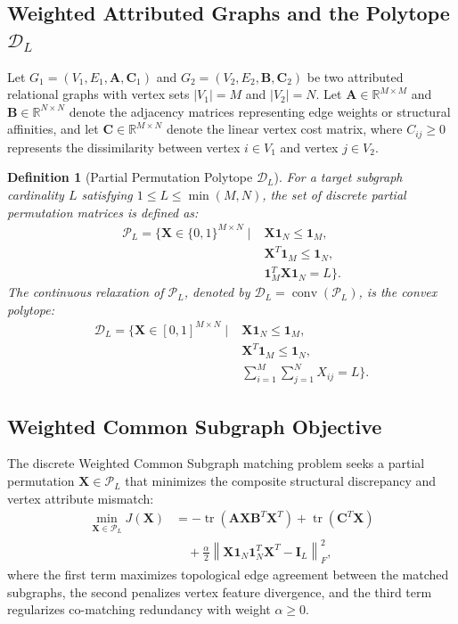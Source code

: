 \documentclass[a4paper,fleqn]{cas-dc}
\theoremstyle{thmstyleone}
\theoremstyle{thmstyletwo}
\theoremstyle{thmstylethree}
\newtheorem{definition}{Definition}
\begin{document}
\subsection{Weighted Attributed Graphs and the Polytope $\mathcal{D}_L$}
Let $G_1 = (V_1, E_1, \mathbf{A}, \mathbf{C}_1)$ and $G_2 = (V_2, E_2, \mathbf{B}, \mathbf{C}_2)$ be two attributed relational graphs with vertex sets $|V_1| = M$ and $|V_2| = N$. Let $\mathbf{A} \in \mathbb{R}^{M \times M}$ and $\mathbf{B} \in \mathbb{R}^{N \times N}$ denote the adjacency matrices representing edge weights or structural affinities, and let $\mathbf{C} \in \mathbb{R}^{M \times N}$ denote the linear vertex cost matrix, where $C_{ij} \ge 0$ represents the dissimilarity between vertex $i \in V_1$ and vertex $j \in V_2$.

\begin{definition}[Partial Permutation Polytope $\mathcal{D}_L$]
For a target subgraph cardinality $L$ satisfying $1 \le L \le \min(M, N)$, the set of discrete partial permutation matrices is defined as:
\begin{align}
\mathcal{P}_L = \Big\{ \mathbf{X} \in \{0, 1\}^{M \times N} \;\Big|\;& \mathbf{X}\mathbf{1}_N \le \mathbf{1}_M, \nonumber \\
& \mathbf{X}^T\mathbf{1}_M \le \mathbf{1}_N, \nonumber \\
& \mathbf{1}_M^T\mathbf{X}\mathbf{1}_N = L \Big\}.
\label{eq:PL}
\end{align}
The continuous relaxation of $\mathcal{P}_L$, denoted by $\mathcal{D}_L = \operatorname{conv}(\mathcal{P}_L)$, is the convex polytope:
\begin{align}
\mathcal{D}_L = \Big\{ \mathbf{X} \in [0, 1]^{M \times N} \;\Big|\;& \mathbf{X}\mathbf{1}_N \le \mathbf{1}_M, \nonumber \\
& \mathbf{X}^T\mathbf{1}_M \le \mathbf{1}_N, \nonumber \\
& \sum_{i=1}^M \sum_{j=1}^N X_{ij} = L \Big\}.
\label{eq:DL}
\end{align}
\end{definition}

\subsection{Weighted Common Subgraph Objective}
The discrete Weighted Common Subgraph matching problem seeks a partial permutation $\mathbf{X} \in \mathcal{P}_L$ that minimizes the composite structural discrepancy and vertex attribute mismatch:
\begin{align}
\min_{\mathbf{X} \in \mathcal{P}_L} J(\mathbf{X}) &= -\operatorname{tr}\left( \mathbf{A}\mathbf{X}\mathbf{B}^T\mathbf{X}^T \right) + \operatorname{tr}\left( \mathbf{C}^T\mathbf{X} \right) \nonumber \\
&\quad + \frac{\alpha}{2} \left\| \mathbf{X}\mathbf{1}_N\mathbf{1}_N^T\mathbf{X}^T - \mathbf{I}_L \right\|_F^2,
\label{eq:wcs_obj}
\end{align}
where the first term maximizes topological edge agreement between the matched subgraphs, the second penalizes vertex feature divergence, and the third term regularizes co-matching redundancy with weight $\alpha \ge 0$.
\end{document}
